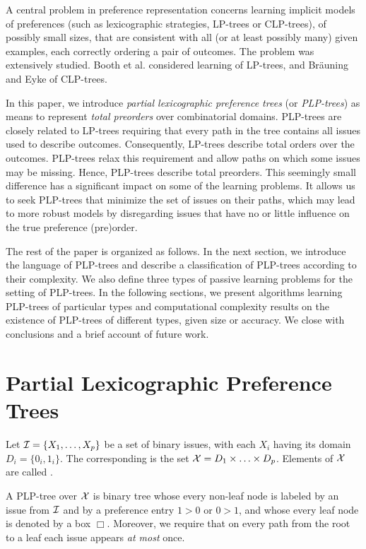 A central problem in preference representation concerns learning 
implicit models of preferences (such as lexicographic strategies,
LP-trees or CLP-trees), of possibly small sizes, that are consistent 
with all (or at least possibly many) given examples, each correctly 
ordering a pair of outcomes. The problem was extensively studied. Booth
et al.  considered learning of LP-trees, and 
Br\"auning and Eyke  of CLP-trees. 

In this paper, we introduce \emph{partial lexicographic preference trees} (or 
\emph{PLP-trees}) as means to represent \emph{total preorders} over 
combinatorial domains. PLP-trees are closely related to LP-trees 
requiring that every path in the tree contains all issues 
used to describe outcomes. Consequently, LP-trees describe total 
orders over the outcomes. PLP-trees relax this requirement and allow 
paths on which some issues may be missing. Hence, 
PLP-trees describe total preorders. This seemingly small difference
has a significant impact on some of the learning problems. It allows
us to seek PLP-trees that minimize the set of issues on their paths,
which may lead to more robust models by disregarding issues 
that have no or little influence on the true preference (pre)order.

The rest of the paper is organized as follows. In the next section, 
we introduce the language of PLP-trees and describe a classification 
of PLP-trees according to their complexity. We also define three types of passive 
learning problems for the setting of PLP-trees. In the following 
sections, we present algorithms learning PLP-trees of particular
types and computational complexity results on the existence of 
PLP-trees of different types, given size or accuracy. We close 
with conclusions and a brief account of future work.


\section{Partial Lexicographic Preference Trees}
Let $\mathcal{I}=\{X_1,\ldots,X_p\}$ be a set of binary issues, with each
$X_i$ having its domain $D_i=\{0_i, 1_i\}$. The corresponding 
 is the set $\mathcal{X}=D_1 \times \ldots \times D_p$.
Elements of  $\mathcal{X}$ are called .

A PLP-tree over $\mathcal{X}$ is binary tree whose every
non-leaf node is labeled by an issue from $\mathcal{I}$ and by a preference
entry $1>0$ or $0>1$, and whose every leaf node is denoted by a box 
$\Box$. Moreover, we require that on every path from the root to a leaf
each issue appears \emph{at most} once. 

